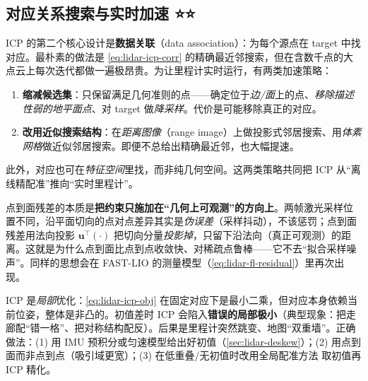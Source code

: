 \subsection{对应关系搜索与实时加速 ⭐⭐}
\label{sec:lidar-corr}

ICP 的第二个核心设计是\textbf{数据关联}（data association）：为每个源点在 target 中找对应。最朴素的做法是 \cref{eq:lidar-icp-corr} 的精确最近邻搜索，但在含数千点的大点云上每次迭代都做一遍极昂贵。为让里程计实时运行，有两类加速策略\cite{carlone2026handbook}：
\begin{enumerate}
  \item \textbf{缩减候选集}：只保留满足几何准则的点——确定位于\emph{边/面}上的点\cite{zhang2014loam}、\emph{移除描述性弱的地平面点}\cite{shan2018legoloam}、对 target 做\emph{降采样}\cite{vizzo2023kissicp}。代价是可能移除真正的对应。
  \item \textbf{改用近似搜索结构}：在\emph{距离图像}（range image）上做投影式邻居搜索\cite{behley2018efficient}、用\emph{体素网格}做近似邻居搜索\cite{zhang2014loam}。即便不总给出精确最近邻，也大幅提速。
\end{enumerate}
此外，对应也可在\emph{特征空间}里找\cite{shan2018legoloam}，而非纯几何空间。这两类策略共同把 ICP 从“离线精配准”推向“实时里程计”。

\begin{insight}
点到面残差的本质是\textbf{把约束只施加在“几何上可观测”的方向上}。两帧激光采样位置不同，沿平面切向的点对点差异其实是\emph{伪误差}（采样抖动），不该惩罚；点到面残差用法向投影 $\mathbf{u}^\top(\cdot)$ 把切向分量\emph{投影掉}，只留下沿法向（真正可观测）的距离。这就是为什么点到面比点到点收敛快、对稀疏点鲁棒——它不去“拟合采样噪声”。同样的思想会在 FAST-LIO 的测量模型（\cref{eq:lidar-fl-residual}）里再次出现。
\end{insight}

\begin{pitfall}
ICP 是\emph{局部}优化：\cref{eq:lidar-icp-obj} 在固定对应下是最小二乘，但对应本身依赖当前位姿，整体是非凸的。初值差时 ICP 会陷入\textbf{错误的局部极小}（典型现象：把走廊配“错一格”、把对称结构配反）。后果是里程计突然跳变、地图“双重墙”。正确做法：(1) 用 IMU 预积分或匀速模型给出好初值（\cref{sec:lidar-deskew}）；(2) 用点到面而非点到点（吸引域更宽）；(3) 在低重叠/无初值时改用全局配准方法\cite{yang2020teaser} 取初值再 ICP 精化。
\end{pitfall}


